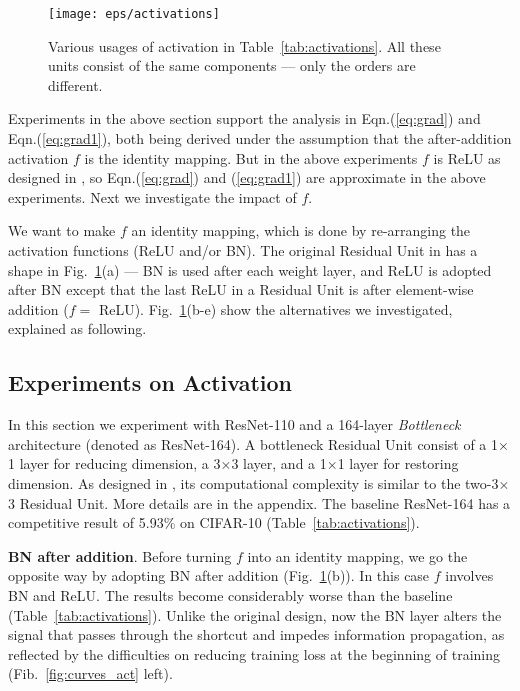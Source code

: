 \documentclass[runningheads]{llncs}
\begin{document}
\begin{figure}[t]
\centering
\texttt{[image: eps/activations]}
\caption{Various usages of activation in Table~\ref{tab:activations}. All these units consist of the same components --- only the orders are different.}
\label{fig:activations}
\end{figure}




Experiments in the above section support the analysis in Eqn.(\ref{eq:grad}) and Eqn.(\ref{eq:grad1}), both being derived under the assumption that the after-addition activation $f$ is the identity mapping. But in the above experiments $f$ is ReLU as designed in \cite{He2016}, so Eqn.(\ref{eq:grad}) and (\ref{eq:grad1}) are approximate in the above experiments. Next we investigate the impact of $f$.

We want to make $f$ an identity mapping, which is done by re-arranging the activation functions (ReLU and/or BN). The original Residual Unit in \cite{He2016} has a shape in Fig.~\ref{fig:activations}(a) --- BN is used after each weight layer, and ReLU is adopted after BN except that the last ReLU in a Residual Unit is after element-wise addition ($f=$  ReLU). Fig.~\ref{fig:activations}(b-e) show the alternatives we investigated, explained as following.


\subsection{Experiments on Activation}

In this section we experiment with ResNet-110 and a 164-layer \emph{Bottleneck} \cite{He2016} architecture (denoted as ResNet-164). A bottleneck Residual Unit consist of a 1$\times$1 layer for reducing dimension, a 3$\times$3 layer, and a 1$\times$1 layer for restoring dimension. As designed in \cite{He2016}, its computational complexity is similar to the two-3$\times$3 Residual Unit. More details are in the appendix.
The baseline ResNet-164 has a competitive result of 5.93\% on CIFAR-10 (Table~\ref{tab:activations}).

\textbf{BN after addition}. Before turning $f$ into an identity mapping, we go the opposite way by adopting BN after addition (Fig.~\ref{fig:activations}(b)). In this case $f$ involves BN and ReLU.
The results become considerably worse than the baseline (Table~\ref{tab:activations}). Unlike the original design, now the BN layer alters the signal that passes through the shortcut and impedes information propagation, as reflected by the difficulties on reducing training loss at the beginning of training (Fib.~\ref{fig:curves_act} left).
\end{document}
